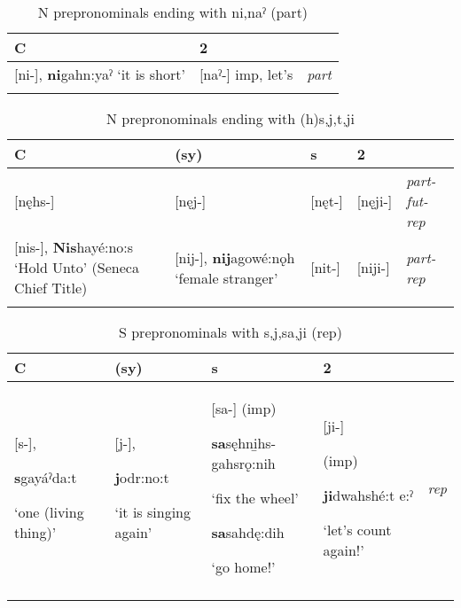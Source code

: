 
\begin{table}
\caption{N prepronominals ending with ni,naˀ (part)}
\label{tab:1:prepronpart}
\scriptsize{
\begin{tabularx}{\textwidth}{XXX}
\lsptoprule
C & 2 & \\
\midrule
{}[ni-], \textbf{ni}gahn\’{ę}:yaˀ ‘it is short’ & [naˀ-] imp, let’s & {\itshape part}\\
\lspbottomrule
\end{tabularx}}
\end{table}




\begin{table}
\caption{N prepronominals ending with (h)s,j,t,ji}
\label{tab:1:partfutrep}
\scriptsize{
\begin{tabularx}{\textwidth}{XXXXX}
\lsptoprule
C & (sy) & s & 2 & \\
\midrule
{}[nęhs-] & [nęj-] & [nęt-] & [nęji-] & {\itshape part-fut-rep}\\
\midrule
{}[nis-], \textbf{Nis}hayé:no:s ‘Hold Unto’ (Seneca Chief Title) & [nij-], \textbf{nij}agowé:nǫh ‘female stranger’ & [nit-] & [niji-] & {\itshape part-rep}\\
\lspbottomrule
\end{tabularx}}
\end{table}



\begin{table}
\caption{S prepronominals with s,j,sa,ji (rep)}
\label{tab:1:srep}
\scriptsize{
\begin{tabularx}{\textwidth}{XXXXX}
\lsptoprule
C & (sy) & s & 2 & \\
\midrule
{}[s-], 

\textbf{s}gayáˀda:t 

‘one (living thing)’ & [j-], 

\textbf{j}odr\’{ę}:no:t 

‘it is singing again’ & [sa-] (imp) 

\textbf{sa}sęhni̱hs-gahsrǫ:nih

‘fix the wheel’

\textbf{sa}sahdę:dih 

‘go home!’ & [ji-] 

(imp) 

\textbf{ji}dwahshé:t e:ˀ 

‘let’s count again!’ & {\itshape rep}\\
\lspbottomrule
\end{tabularx}}
\end{table}


